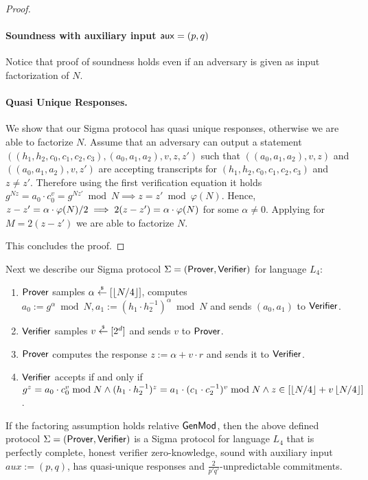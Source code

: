 \begin{proof}
\paragraph{Soundness with auxiliary input $\mathsf{aux} = (p,q)$} Notice that proof of soundness holds even if an adversary is given as input factorization of $N$.

\paragraph{Quasi Unique Responses.} We show that our Sigma protocol has quasi unique responses, otherwise we are able to factorize $N$. Assume that an adversary can output a statement $((h_1, h_2, c_0, c_1, c_2,c_3), (a_0, a_1, a_2), v, z, z')$ such that $((a_0, a_1, a_2), v, z)$ and $((a_0, a_1, a_2), v, z')$ are accepting transcripts for $(h_1, h_2, c_0, c_1, c_2, c_3)$ and $z \neq z'$. Therefore using the first verification equation it holds $g^{Nz} = a_0 \cdot c_0^v = g^{Nz'} \bmod N \implies z = z' \bmod \varphi(N)$. Hence, $z-z' = \alpha \cdot \varphi(N)/2 \implies 2(z-z') = \alpha \cdot \varphi(N) $ for some $\alpha \neq 0$. Applying  for $M=2(z-z')$ we are able to factorize $N$.

This concludes the proof.
\end{proof}

Next we describe our Sigma protocol $\Sigma = (\mathsf{Prover}, \mathsf{Verifier})$ for language $L_4$:
\begin{enumerate}
\item $\mathsf{Prover}$ samples $\alpha \stackrel{{\scriptscriptstyle\$}}{\leftarrow} [\left\lfloor N/4 \right\rfloor]$, computes $a_0:=g^\alpha \bmod N, a_1:= (h_1\cdot h_2^{-1})^\alpha \bmod N$ and sends $(a_0, a_1)$ to $\mathsf{Verifier}$.
\item $\mathsf{Verifier}$ samples $v \stackrel{{\scriptscriptstyle\$}}{\leftarrow} [2^d]$ and sends $v$ to $\mathsf{Prover}$.
\item $\mathsf{Prover}$ computes the response $z:= \alpha + v \cdot r$ and sends it to $\mathsf{Verifier}$.
\item $\mathsf{Verifier}$ accepts if and only if $g^z = a_0 \cdot c_0^v \bmod N \land (h_1\cdot h_2^{-1})^z = a_1 \cdot (c_1\cdot c_2^{-1})^v \bmod N \land z \in [\left\lfloor N/4 \right\rfloor + v\left\lfloor N/4 \right\rfloor]$.
\end{enumerate}

\begin{theorem}
If the factoring assumption holds relative $\mathsf{GenMod}$, then the above defined protocol $\Sigma = (\mathsf{Prover}, \mathsf{Verifier})$ is a Sigma protocol for language $L_4$ that is perfectly complete, honest verifier zero-knowledge, sound with auxiliary input $aux:=(p,q)$, has quasi-unique responses and $\frac{2}{p'q'}$-unpredictable commitments. 
\end{theorem}

